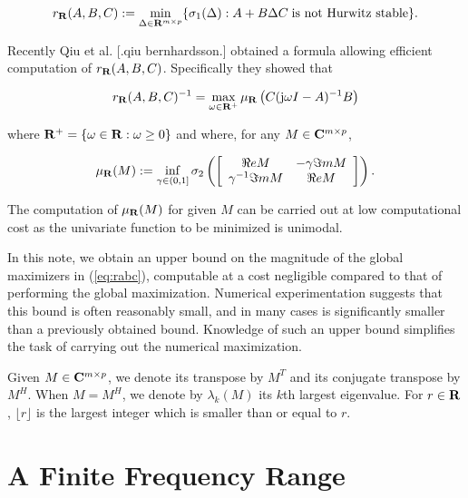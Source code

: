 \[ 
r_{\bf R}(A,B,C):=\min_{\Delta\in{\bf R}^{m \times p}} 
       \{ \sigma_{1}(\Delta): A+B \Delta C \; \mbox{is not Hurwitz stable}\}.  
\]

\noindent
Recently Qiu et al. [.qiu bernhardsson.] obtained a formula allowing 
efficient computation of $r_{\bf R}(A,B,C)$. Specifically they showed that

\begin{equation}
r_{\bf R}(A,B,C)^{-1}= \max_{\omega \in {\bf R}^+}  \mu_{\bf R}\left( C({\rm j}\omega I-A)^{-1}B\right)
\label{eq:rabc}
\end{equation}

\noindent
where ${\bf R}^+=\{ \omega \in {\bf R}: \omega \geq 0 \}$ and where, for any 
$M \in {\bf C}^{m \times p}$,

\begin{equation}
\mu_{\bf R}(M):=\inf_{\gamma \in (0,1]} \sigma_2 
\left( \left[ 
\begin{array}{cc}
\Re eM & -\gamma \Im mM\\
\gamma^{-1}\Im mM & \Re eM
\end{array}  \right] \right).
\label{eq:mu}
\end{equation}

\noindent
The computation of $\mu_{\bf R}(M)$ for given $M$ can be carried out at low 
computational cost as the univariate function to be minimized is unimodal.

In this note, we obtain an upper bound on the magnitude of the global 
maximizers in (\ref{eq:rabc}), computable at a cost negligible compared 
to that of performing the global maximization. Numerical experimentation
suggests that this bound is often reasonably small, and in many cases
is significantly smaller than a previously obtained bound. 
Knowledge of such an 
upper bound simplifies the task of carrying out the numerical maximization.

Given $M \in {\bf C}^{m \times p}$, we denote its transpose by $M^T$
and its conjugate transpose by $M^H$. When $M=M^H$, we denote by 
$\lambda_k(M)$ its $k$th largest eigenvalue. For $r \in {\bf R}$, 
$\lfloor r \rfloor$ is the largest integer which is smaller than
or equal to $r$.

\bigskip
\section{A Finite Frequency Range}

